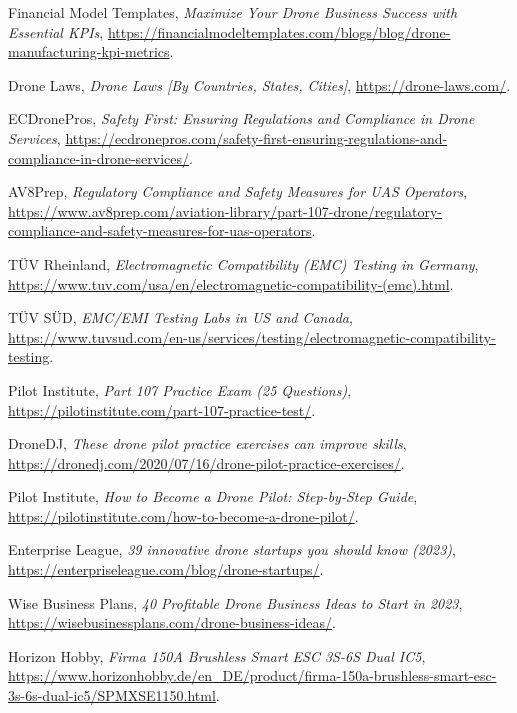 \documentclass[12pt]{article}
\begin{document}
\begin{thebibliography}{9}
		Financial Model Templates,
		\textit{Maximize Your Drone Business Success with Essential KPIs},
		\url{https://financialmodeltemplates.com/blogs/blog/drone-manufacturing-kpi-metrics}.
		
		Drone Laws,
		\textit{Drone Laws [By Countries, States, Cities]},
		\url{https://drone-laws.com/}.
		
		ECDronePros,
		\textit{Safety First: Ensuring Regulations and Compliance in Drone Services},
		\url{https://ecdronepros.com/safety-first-ensuring-regulations-and-compliance-in-drone-services/}.
		
		AV8Prep,
		\textit{Regulatory Compliance and Safety Measures for UAS Operators},
		\url{https://www.av8prep.com/aviation-library/part-107-drone/regulatory-compliance-and-safety-measures-for-uas-operators}.
				
		TÜV Rheinland,
		\textit{Electromagnetic Compatibility (EMC) Testing in Germany},
		\url{https://www.tuv.com/usa/en/electromagnetic-compatibility-(emc).html}.
		
		TÜV SÜD,
		\textit{EMC/EMI Testing Labs in US and Canada},
		\url{https://www.tuvsud.com/en-us/services/testing/electromagnetic-compatibility-testing}.
		
		Pilot Institute,
		\textit{Part 107 Practice Exam (25 Questions)},
		\url{https://pilotinstitute.com/part-107-practice-test/}.
		
		DroneDJ,
		\textit{These drone pilot practice exercises can improve skills},
		\url{https://dronedj.com/2020/07/16/drone-pilot-practice-exercises/}.
		
		Pilot Institute,
		\textit{How to Become a Drone Pilot: Step-by-Step Guide},
		\url{https://pilotinstitute.com/how-to-become-a-drone-pilot/}.
		
		Enterprise League,
		\textit{39 innovative drone startups you should know (2023)},
		\url{https://enterpriseleague.com/blog/drone-startups/}.
		
		Wise Business Plans,
		\textit{40 Profitable Drone Business Ideas to Start in 2023},
		\url{https://wisebusinessplans.com/drone-business-ideas/}.
		
		Horizon Hobby,
		\textit{Firma 150A Brushless Smart ESC 3S-6S Dual IC5},
		\url{https://www.horizonhobby.de/en_DE/product/firma-150a-brushless-smart-esc-3s-6s-dual-ic5/SPMXSE1150.html}.
				
	\end{thebibliography}
	
\end{document}
